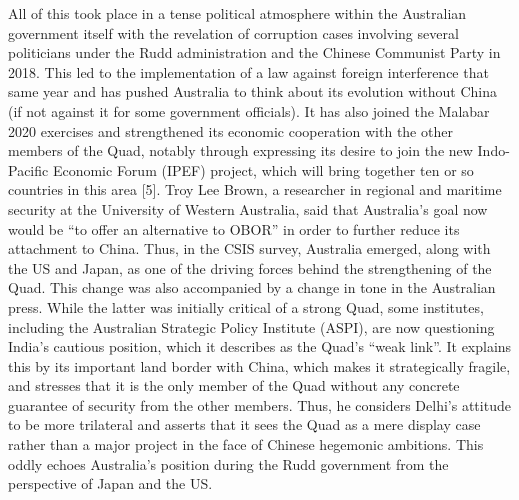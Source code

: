 \documentclass[11pt,a4paper]{article}
\begin{document}
All of this took place in a tense political atmosphere within the Australian government itself with the revelation of corruption cases involving several politicians under the Rudd administration and the Chinese Communist Party in 2018. This led to the implementation of a law against foreign interference that same year and has pushed Australia to think about its evolution without China (if not against it for some government officials). It has also joined the Malabar 2020 exercises and strengthened its economic cooperation with the other members of the Quad, notably through expressing its desire to join the new Indo-Pacific Economic Forum (IPEF) project, which will bring together ten or so countries in this area {[}5{]}. Troy Lee Brown, a researcher in regional and maritime security at the University of Western Australia, said that Australia’s goal now would be “to offer an alternative to OBOR” in order to further reduce its attachment to China. Thus, in the CSIS survey, Australia emerged, along with the US and Japan, as one of the driving forces behind the strengthening of the Quad. This change was also accompanied by a change in tone in the Australian press. While the latter was initially critical of a strong Quad, some institutes, including the Australian Strategic Policy Institute (ASPI), are now questioning India’s cautious position, which it describes as the Quad’s “weak link”. It explains this by its important land border with China, which makes it strategically fragile, and stresses that it is the only member of the Quad without any concrete guarantee of security from the other members. Thus, he considers Delhi’s attitude to be more trilateral and asserts that it sees the Quad as a mere display case rather than a major project in the face of Chinese hegemonic ambitions. This oddly echoes Australia’s position during the Rudd government from the perspective of Japan and the US.
\end{document}
